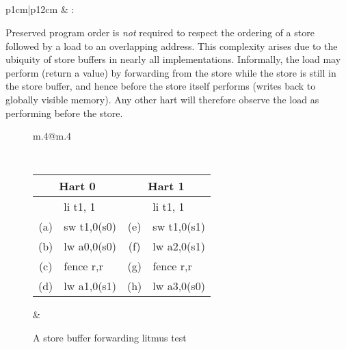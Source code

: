 \subsection{}
\label{sec:memory:loadvalueaxiom}
\begin{tabular}{p{1cm}|p{12cm}} &
: \loadvalueaxiom
\end{tabular}

Preserved program order is {\em not} required to respect the ordering of a store followed by a load to an overlapping address.
This complexity arises due to the ubiquity of store buffers in nearly all implementations.
Informally, the load may perform (return a value) by forwarding from the store while the store is still in the store buffer, and hence before the store itself performs (writes back to globally visible memory).
Any other hart will therefore observe the load as performing before the store.

\begin{figure}[h!]
  \centering
  \begin{tabular}{m{.4\linewidth}@{\qquad}m{.4\linewidth}}
  {
    \tt\small
    \begin{tabular}{cl||cl}
    \multicolumn{2}{c}{Hart 0} & \multicolumn{2}{c}{Hart 1} \\
    \hline
          & li t1, 1    &     & li t1, 1    \\
      (a) & sw t1,0(s0) & (e) & sw t1,0(s1) \\
      (b) & lw a0,0(s0) & (f) & lw a2,0(s1) \\
      (c) & fence r,r   & (g) & fence r,r   \\
      (d) & lw a1,0(s1) & (h) & lw a3,0(s0) \\
    \end{tabular}
  }
  &
  
  \end{tabular}
  \caption{A store buffer forwarding litmus test}
  \label{fig:litmus:storebuffer}
\end{figure}

